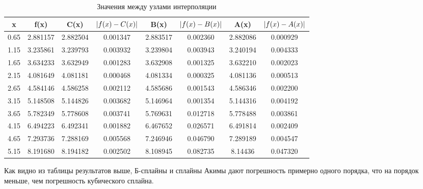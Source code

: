 \documentclass[12pt]{article}
\DeclarePairedDelimiter\abs{\lvert}{\rvert}
\begin{document}
\begin{table}[h]
    \caption{Значения между узлами интерполяции}
	\begin{center}
 	\begin{tabular}{|c|c|c|c|c|c|c|c|}
\hline
x & f(x) & C(x) & $\abs{f(x)-C(x)}$ & B(x) & $\abs{f(x)-B(x)}$ & A(x) & $\abs{f(x)-A(x)}$ \\
\hline
0.65 & 2.881157 & 2.882504 & 0.001347 & 2.883517 & 0.002360 & 2.882086 & 0.000929 \\
\hline
1.15 & 3.235861 & 3.239793 & 0.003932 & 3.239804 & 0.003943 & 3.240194 & 0.004333 \\
\hline
1.65 & 3.634233 & 3.632949 & 0.001283 & 3.632908 & 0.001325 & 3.632210 & 0.002023 \\
\hline
2.15 & 4.081649 & 4.081181 & 0.000468 & 4.081334 & 0.000325 & 4.081136 & 0.000513 \\
\hline
2.65 & 4.584146 & 4.586258 & 0.002112 & 4.585686 & 0.001543 & 4.586346 & 0.002200 \\
\hline
3.15 & 5.148508 & 5.144826 & 0.003682 & 5.146964 & 0.001354 & 5.144316 & 0.004192 \\
\hline
3.65 & 5.782349 & 5.778608 & 0.003741 & 5.769631 & 0.012718 & 5.778488 & 0.003861 \\
\hline
4.15 & 6.494223 & 6.492341 & 0.001882 & 6.467652 & 0.026571 & 6.491814 & 0.002409 \\
\hline
4.65 & 7.293736 & 7.288169 & 0.005568 & 7.246946 & 0.046790 & 7.289189 & 0.004547 \\
\hline
5.15 & 8.191680 & 8.194182 & 0.002502 & 8.108945 & 0.082735 & 8.14436 & 0.047320 \\
\hline
\end{tabular}
\end{center}
    \end{table}
    
    Как видно из таблицы результатов выше, Б-сплайны и сплайны Акимы дают погрешность примерно одного порядка, что на порядок меньше, чем погрешность кубического сплайна.
        

\end{document}
